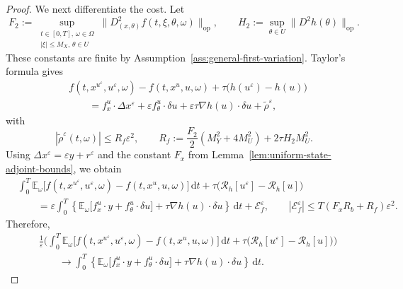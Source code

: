 \documentclass[11pt]{amsart}
\numberwithin{equation}{section} %
\newcommand{\dd}{\mathrm{d}}
\theoremstyle{remark}
\begin{document}
\begin{proof}
We next differentiate the cost. Let
\[
F_2:=\sup_{\substack{t\in[0,T],\,\omega\in\Omega\\|\xi|\le M_X,\,\theta\in U}}\|D^2_{(x,\theta)}f(t, \xi, \theta, \omega)\|_{\mathrm{op}},
\qquad H_2:=\sup_{\theta\in U}\|D^2h(\theta)\|_{\mathrm{op}}.
\]
These constants are finite by
Assumption~\ref{ass:general-first-variation}. Taylor's formula gives
\begin{align*}
&f(t,x^{u^\varepsilon},u^\varepsilon,\omega)
-f(t,x^u,u,\omega)
+\tau\bigl(h(u^\varepsilon)-h(u)\bigr)\\
&\qquad=f_x^u\cdot\Delta x^\varepsilon
+\varepsilon f_\theta^u\cdot\delta u
+\varepsilon\tau\nabla h(u)\cdot\delta u
+\widetilde\rho^\varepsilon,
\end{align*}
with
\begin{equation}
\label{eq:L-remainder}
|\widetilde\rho^\varepsilon(t,\omega)|
\le R_f\varepsilon^2,
\qquad
R_f:=\frac{F_2}{2}(M_Y^2+4M_U^2)+2\tau H_2M_U^2.
\end{equation}
Using $\Delta x^\varepsilon=\varepsilon y+r^\varepsilon$ and the
constant $F_x$ from Lemma~\ref{lem:uniform-state-adjoint-bounds},
we obtain
\begin{align}
&\int_0^T\mathbb E_\omega
\bigl[f(t,x^{u^\varepsilon},u^\varepsilon,\omega)
-f(t,x^u,u,\omega)\bigr]\,\dd t
+\tau\bigl(\mathcal R_h[u^\varepsilon]-\mathcal R_h[u]\bigr)
\nonumber\\
&\qquad=\varepsilon\int_0^T
\left\{\mathbb E_\omega
\bigl[f_x^u\cdot y+f_\theta^u\cdot\delta u\bigr]
+\tau\nabla h(u)\cdot\delta u\right\}\,\dd t
+\mathcal E_f^\varepsilon,
\qquad
|\mathcal E_f^\varepsilon|
\le T(F_xR_b+R_f)\varepsilon^2. \nonumber
\end{align}
Therefore,
\begin{align}
\label{eq:running-cost-expansion}
&\frac{1}{\varepsilon} \Bigg( \int_0^T\mathbb E_\omega
\bigl[f(t,x^{u^\varepsilon},u^\varepsilon,\omega)
-f(t,x^u,u,\omega)\bigr]\,\dd t
+\tau\bigl(\mathcal R_h[u^\varepsilon]-\mathcal R_h[u]\bigr) \Bigg)
\nonumber\\
&\qquad \longrightarrow \int_0^T
\left\{\mathbb E_\omega
\bigl[f_x^u\cdot y+f_\theta^u\cdot\delta u\bigr]
+\tau\nabla h(u)\cdot\delta u\right\}\,\dd t.
\end{align}


\end{proof}
\end{document}
